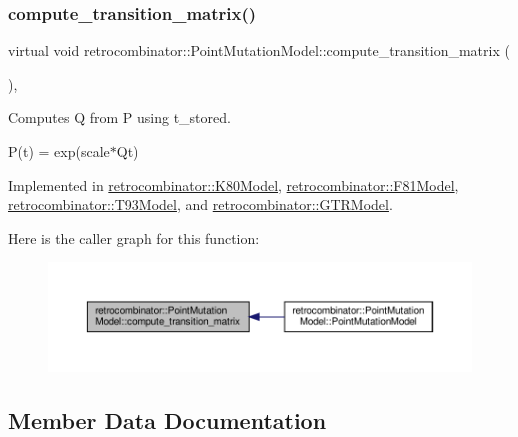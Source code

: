 \subsubsection{\texorpdfstring{compute\+\_\+transition\+\_\+matrix()}{compute\_transition\_matrix()}}
{\footnotesize\ttfamily virtual void retrocombinator\+::\+Point\+Mutation\+Model\+::compute\+\_\+transition\+\_\+matrix (\begin{DoxyParamCaption}{ }\end{DoxyParamCaption})\hspace{0.3cm}{\ttfamily [protected]}, {}}



Computes Q from P using t\+\_\+stored. 

P(t) = exp(scale$\ast$\+Qt) 

Implemented in \hyperlink{classretrocombinator_1_1K80Model_a70f669e2a31d34a37b19fd185219a9ce}{retrocombinator\+::\+K80\+Model}, \hyperlink{classretrocombinator_1_1F81Model_a5bb9c63e55c4f8f7b9573281ff6ee610}{retrocombinator\+::\+F81\+Model}, \hyperlink{classretrocombinator_1_1T93Model_aaa8c96927a1ff3b8c611f0d0f9d6f36a}{retrocombinator\+::\+T93\+Model}, and \hyperlink{classretrocombinator_1_1GTRModel_a7d71f990fd33bcb7fc6a74accf03d7ae}{retrocombinator\+::\+G\+T\+R\+Model}.

Here is the caller graph for this function\+:
\nopagebreak
\begin{figure}[H]
\begin{center}
\leavevmode
\includegraphics[width=350pt]{classretrocombinator_1_1PointMutationModel_a29357db0a7cfb35ab1540840aa4cfda1_icgraph}
\end{center}
\end{figure}


\subsection{Member Data Documentation}
\mbox{\label{classretrocombinator_1_1PointMutationModel_a6c6e94bfbf16c3893068e3db1597e941}} 
